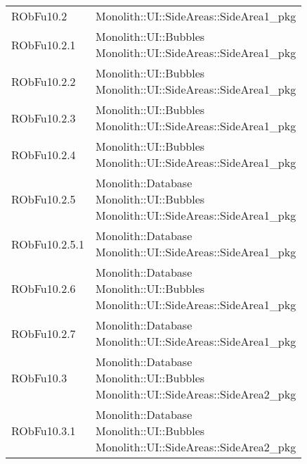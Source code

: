 \begin{center}
\begin{longtable}{|
*{1}{>{\centering\arraybackslash}p{2.5cm}|}
*{1}{>{\centering\arraybackslash}p{7.5cm}|}}
{\\}\\\hline
RObFu10.2 & \makecell{Monolith::UI::SideAreas::SideArea1\_pkg
\\}\\\hline
RObFu10.2.1 & \makecell{Monolith::UI::Bubbles
\\Monolith::UI::SideAreas::SideArea1\_pkg
\\}\\\hline
RObFu10.2.2 & \makecell{Monolith::UI::Bubbles
\\Monolith::UI::SideAreas::SideArea1\_pkg
\\}\\\hline
RObFu10.2.3 & \makecell{Monolith::UI::Bubbles
\\Monolith::UI::SideAreas::SideArea1\_pkg
\\}\\\hline
RObFu10.2.4 & \makecell{Monolith::UI::Bubbles
\\Monolith::UI::SideAreas::SideArea1\_pkg
\\}\\\hline
RObFu10.2.5 & \makecell{Monolith::Database
\\Monolith::UI::Bubbles
\\Monolith::UI::SideAreas::SideArea1\_pkg
\\}\\\hline
RObFu10.2.5.1 & \makecell{Monolith::Database
\\Monolith::UI::SideAreas::SideArea1\_pkg
\\}\\\hline
RObFu10.2.6 & \makecell{Monolith::Database
\\Monolith::UI::Bubbles
\\Monolith::UI::SideAreas::SideArea1\_pkg
\\}\\\hline
RObFu10.2.7 & \makecell{Monolith::Database
\\Monolith::UI::SideAreas::SideArea1\_pkg
\\}\\\hline
RObFu10.3 & \makecell{Monolith::Database
\\Monolith::UI::Bubbles
\\Monolith::UI::SideAreas::SideArea2\_pkg
\\}\\\hline
RObFu10.3.1 & \makecell{Monolith::Database
\\Monolith::UI::Bubbles
\\Monolith::UI::SideAreas::SideArea2\_pkg
\\}\\\hline

\end{longtable}
\end{center}
